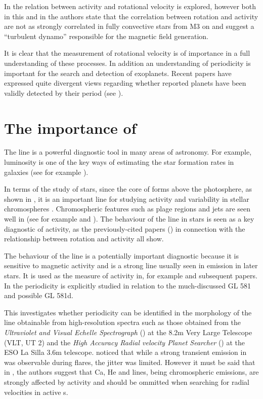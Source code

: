 In \citet{mohanty02} the relation between activity and rotational velocity is explored, however both in this and in
\citet{mohanty03} the authors state that the correlation between rotation and activity are not as strongly correlated in
fully convective stars from M3 on and suggest a ``turbulent dynamo'' responsible for the magnetic field generation.

It is clear that the measurement of rotational velocity is of importance in a full understanding of these processes. In
addition an understanding of periodicity is important for the search and detection of exoplanets. Recent papers have
expressed quite divergent views regarding whether reported planets have been validly detected by their period (see
\citealt{barnes13,robertson14,robertson14a,tuomi13aug,robertson15}). 

\section{The importance of {\ha}}
\protect\label{section:intohalpha}

The {\ha} line is a powerful diagnostic tool in many areas of astronomy. For example, {\ha} luminosity is one of the key
ways of estimating the star formation rates in galaxies (see for example \citet{rosagonzalez02}).

In terms of the study of stars, since the core of {\ha} forms above the photosphere, as shown in \citep{vernazza81}, it
is an important line for studying activity and variability in stellar chromospheres \citep{hall08}. Chromospheric
features such as plage regions and jets are seen well in {\ha} (see for example \citet{kneer10} and \citet{kuridze11}). 
The behaviour of the {\ha} line in {\rdwarf} stars is seen as a key diagnostic of activity, as the previously-cited
papers (\citealt{mohanty02, mohanty03, reiners08, schmidt14}) in connection with the relationship between rotation and
activity all show.

The behaviour of the {\ha} line is a potentially important diagnostic because it is sensitive to magnetic activity and
is a strong line usually seen in emission in later {\rdwarf} stars. It is used as the measure of activity in, for
example \citet{mohanty03} and subsequent papers. In \citet{hatzes15} the {\ha} periodicity is explicitly studied in
relation to the much-discussed GL 581 and possible GL 581d.

This {\paperorthesis} investigates whether periodicity can be identified in the morphology of the {\ha} line obtainable
from high-resolution spectra such as those obtained from the \textit{Ultraviolet and Visual Echelle Spectrograph}
({\uves}) at the 8.2m Very Large Telescope (VLT, UT 2) and the \textit{High Accuracy Radial velocity Planet Searcher}
({\harps}) at the ESO La Silla 3.6m telescope. \citet{barnes14} noticed that while a strong transient emission in {\ha}
was observable during flares, the jitter was limited. However it must be said that in \citet{reiners09}, the authors
suggest that Ca, He and {\ha} lines, being chromospheric emissions, are strongly affected by activity and should be
ommitted when searching for radial velocities in active \rdwarf s.

